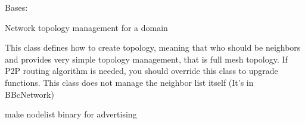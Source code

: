 \documentclass[letterpaper,10pt,english]{sphinxmanual}
\begin{document}
\begin{fulllineitems}
\label{\detokenize{bbc1.core.topology_manager:bbc1.core.topology_manager.TopologyManagerBase}}
Bases: 

Network topology management for a domain

This class defines how to create topology, meaning that who should be neighbors and provides very simple topology
management, that is full mesh topology. If P2P routing algorithm is needed, you should override this class
to upgrade functions.
This class does not manage the neighbor list itself (It’s in BBcNetwork)

\begin{fulllineitems}
\label{\detokenize{bbc1.core.topology_manager:bbc1.core.topology_manager.TopologyManagerBase.NEIGHBOR_LIST_REFRESH_INTERVAL}}
\end{fulllineitems}


\begin{fulllineitems}
\label{\detokenize{bbc1.core.topology_manager:bbc1.core.topology_manager.TopologyManagerBase.NOTIFY_NEIGHBOR_LIST}}
\end{fulllineitems}


\begin{fulllineitems}
\label{\detokenize{bbc1.core.topology_manager:bbc1.core.topology_manager.TopologyManagerBase.make_neighbor_list}}
make nodelist binary for advertising

\end{fulllineitems}


\end{fulllineitems}
\end{document}
